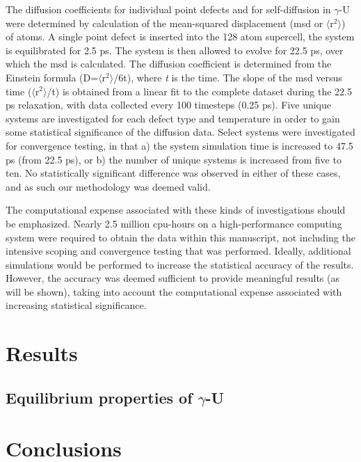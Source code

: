 \documentclass[review]{elsarticle}
\begin{document}
The diffusion coefficients for individual point defects and for self-diffusion in $\gamma$-U were determined by calculation of the mean-squared displacement (msd or $\langle$r$^2$$\rangle$) of atoms. A single point defect is inserted into the 128 atom supercell, the system is equilibrated for 2.5 ps. The system is then allowed to evolve for 22.5 ps, over which the msd is calculated. The diffusion coefficient is determined from the Einstein formula (D=$\langle$r$^2$$\rangle$/6t), where \textit{t} is the time. The slope of the msd versus time ($\langle$r$^2$$\rangle$/t) is obtained from a linear fit to the complete dataset during the 22.5 ps relaxation, with data collected every 100 timesteps (0.25 ps). Five unique systems are investigated for each defect type and temperature in order to gain some statistical significance of the diffusion data. Select systems were investigated for convergence testing, in that a) the system simulation time is increased to 47.5 ps (from 22.5 ps), or b) the number of unique systems is increased from five to ten. No statistically significant difference was observed in either of these cases, and as such our methodology was deemed valid. 

The computational expense associated with these kinds of investigations should be emphasized. Nearly 2.5 million cpu-hours on a high-performance computing system were required to obtain the data within this manuscript, not including the intensive scoping and convergence testing that was performed. Ideally, additional simulations would be performed to increase the statistical accuracy of the results. However, the accuracy was deemed sufficient to provide meaningful results (as will be shown), taking into account the computational expense associated with increasing statistical significance. 

\section{Results}
\subsection{Equilibrium properties of $\gamma$-U}


\FloatBarrier

\section{Conclusions}
\end{document}
